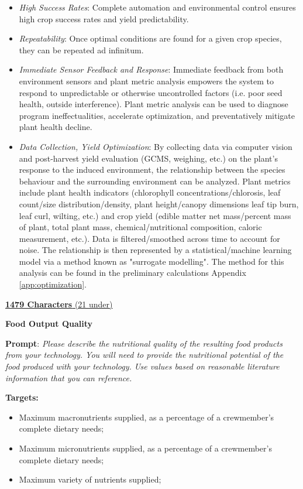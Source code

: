 \documentclass{report}
\begin{document}
\begin{itemize}
    \item \textit{High Success Rates}: Complete automation and environmental control ensures high crop success rates and yield predictability.
    \item \textit{Repeatability}: Once optimal conditions are found for a given crop species, they can be repeated ad infinitum.
    \item \textit{Immediate Sensor Feedback and Response}: Immediate feedback from both environment sensors and plant metric analysis empowers the system to respond to unpredictable or otherwise uncontrolled factors (i.e. poor seed health, outside interference). Plant metric analysis can be used to diagnose program ineffectualities, accelerate optimization, and preventatively mitigate plant health decline.
    \item \textit{Data Collection, Yield Optimization}: By collecting data via computer vision and post-harvest yield evaluation (GCMS, weighing, etc.) on the plant's response to the induced environment, the relationship between the species behaviour and the surrounding environment can be analyzed. Plant metrics include plant health indicators (chlorophyll concentrations/chlorosis, leaf count/size distribution/density, plant height/canopy dimensions leaf tip burn, leaf curl, wilting, etc.) and crop yield (edible matter net mass/percent mass of plant, total plant mass, chemical/nutritional composition, caloric measurement, etc.). Data is filtered/smoothed across time to account for noise. The relationship is then represented by a statistical/machine learning model via a method known as "surrogate modelling". The method for this analysis can be found in the preliminary calculations Appendix \ref{app:optimization}.
    
\end{itemize}

\uline{\textbf{1479 Characters} (21 under)}

\vspace{0.5cm}

\textbf{Food Output Quality}
\label{sec:resource-outputquality}

\textbf{Prompt}: \textit{Please describe  the nutritional quality of the resulting food products from your technology. You will need to provide the nutritional potential of the food produced with your technology. Use values based on reasonable literature information that you can reference.}

\textbf{Targets:}
\begin{itemize}
    \item Maximum macronutrients supplied, as a percentage of a crewmember’s complete dietary needs;
    \item Maximum micronutrients supplied, as a percentage of a crewmember’s complete dietary needs;
    \item Maximum variety of nutrients supplied;
\end{itemize}
\end{document}
